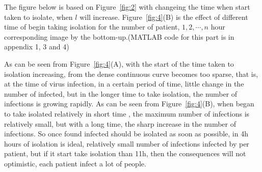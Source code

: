 The figure below is based on Figure~\ref{fig:2} with changeing
the time when start taken to isolate, when $l$ will increase.
Figure~\ref{fig:4}(B) is the effect of different time of begin taking 
isolation for the number of patient, $1,2,\cdots,n$ hour
corresponding image by the bottom-up.(MATLAB code for this part
is in appendix 1, 3 and 4)\par
As can be seen from Figure~\ref{fig:4}(A), with the start of
the time taken to isolation increasing, from the dense
continuous curve becomes too sparse, that is, at the time of
virus infection, in a certain period of time, little change in
the number of infected, but in the longer time to take
isolation, the number of infections is growing rapidly.
As can be seen from Figure~\ref{fig:4}(B), when began to take
isolated relatively in short time , the maximum number of
infections is relatively small, but with a long time, the sharp
increase in the number of infections. So once found infected
should be isolated as soon as possible, in 4h hours of isolation
is ideal, relatively small number of infections infected by per
patient, but if it start take isolation than 11h, then the
consequences will not optimistic, each patient infect
a lot of people.


